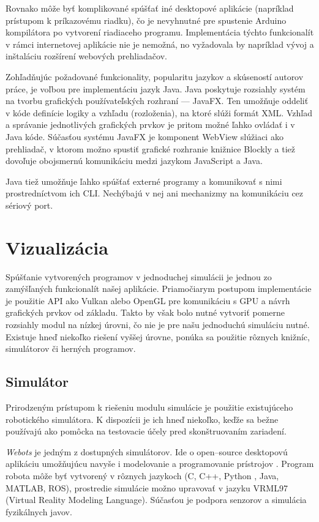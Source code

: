 Rovnako môže byť komplikované spúšťať iné desktopové aplikácie (napríklad prístupom k príkazovému riadku), čo je nevyhnutné pre spustenie Arduino kompilátora po vytvorení riadiaceho programu. Implementácia týchto funkcionalít v rámci internetovej aplikácie nie je nemožná, no vyžadovala by napríklad vývoj a inštaláciu rozšírení webových prehliadačov.

Zohľadňujúc požadované funkcionality, popularitu jazykov a skúseností autorov práce, je voľbou pre implementáciu jazyk Java. Java poskytuje rozsiahly systém na tvorbu grafických používateľských rozhraní --- JavaFX. Ten umožňuje oddeliť v kóde definície logiky a vzhľadu (rozloženia), na ktoré slúži formát XML. Vzhľad a správanie jednotlivých grafických prvkov je pritom možné ľahko ovládať i v Java kóde. Súčasťou systému JavaFX je komponent WebView slúžiaci ako prehliadač, v ktorom možno spustiť grafické rozhranie knižnice Blockly a tiež dovoľuje obojsmernú komunikáciu medzi jazykom JavaScript a Java.

Java tiež umožňuje ľahko spúšťať externé programy a komunikovať s nimi prostredníctvom ich CLI. Nechýbajú v nej ani mechanizmy na komunikáciu cez sériový port.


\section{Vizualizácia}
Spúšťanie vytvorených programov v jednoduchej simulácii je jednou zo zamýšľaných funkcionalít našej aplikácie. Priamočiarym postupom implementácie je použitie API ako Vulkan alebo OpenGL pre komunikáciu s GPU a návrh grafických prvkov od základu. Takto by však bolo nutné vytvoriť pomerne rozsiahly modul na nízkej úrovni, čo nie je pre našu jednoduchú simuláciu nutné. Existuje hneď niekoľko riešení vyššej úrovne, ponúka sa použitie rôznych knižníc, simulátorov či herných programov.

\subsection{Simulátor}
Prirodzeným prístupom k riešeniu modulu simulácie je použitie existujúceho robotického simulátora. K dispozícii je ich hneď niekoľko, keďže sa bežne používajú ako pomôcka na testovacie účely pred skonštruovaním zariadení.

\textit{Webots} je jedným z dostupných simulátorov. Ide o open--source desktopovú aplikáciu umožňujúcu navyše i modelovanie a programovanie prístrojov \cite{Webots}. Program robota môže byť vytvorený v rôznych jazykoch (C, C++, Python , Java, MATLAB, ROS), prostredie simulácie možno upravovať v jazyku VRML97 (Virtual Reality Modeling Language). Súčasťou je podpora senzorov a simulácia fyzikálnych javov.

